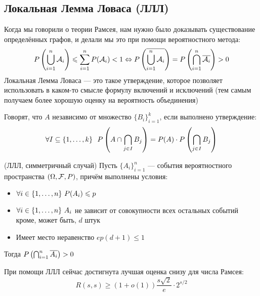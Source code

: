 \subsection{Локальная Лемма Ловаса (ЛЛЛ)}

\begin{note}
	Когда мы говорили о теории Рамсея, нам нужно было доказывать существование определённых графов, и делали мы это при помощи  вероятностного метода:
	\[
		P\left(\bigcup_{i = 1}^n \mathcal{A}_i\right) \leqslant \sum_{i = 1}^n P(\mathcal{A}_i) < 1 \Leftrightarrow P\left(\overline{\bigcup_{i = 1}^n \mathcal{A}_i}\right) = P\left(\bigcap_{i = 1}^n \overline{\mathcal{A}_i}\right) > 0
	\]
	Локальная Лемма Ловаса --- это такое утверждение, которое позволяет использовать в каком-то смысле формулу включений и исключений (тем самым получаем более хорошую оценку на вероятность объединения)
\end{note}

\begin{reminder}
	Говорят, что $A$ независимо от множество $\{B_i\}_{i = 1}^k$, если выполнено утверждение:
	\[
		\forall I \subseteq \{1, \ldots, k\}\ \ P\left(A \cap \bigcap_{j \in I} B_j\right) = P(A) \cdot P\left(\bigcap_{j \in I} B_j\right)
	\]
\end{reminder}

\begin{theorem} (ЛЛЛ, симметричный случай)
	Пусть $\{A_i\}_{i = 1}^n$ --- события вероятностного пространства $(\Omega, \mathcal{F}, P)$, причём выполнены условия:
	\begin{itemize}
		\item $\forall i \in \{1, \ldots, n\}\ P(A_i) \leqslant p$
		
		\item $\forall i \in \{1, \ldots, n\}\ A_i$ не зависит от совокупности всех остальных событий кроме, может быть, $d$ штук
		
		\item Имеет место неравенство $ep(d + 1) \le 1$
	\end{itemize}
	Тогда $P\left(\bigcap_{i = 1}^n \overline{A_i}\right) > 0$
\end{theorem}

\begin{theorem}
	При помощи ЛЛЛ сейчас достигнута лучшая оценка снизу для числа Рамсея:
	\[
		R(s, s) \ge (1 + o(1)) \frac{s\sqrt{2}}{e} \cdot 2^{s / 2}
	\]
\end{theorem}

